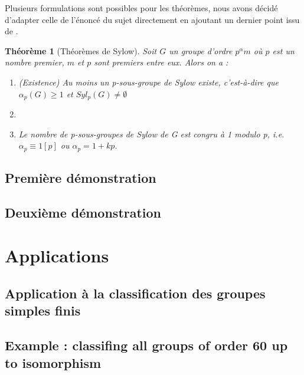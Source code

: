 \documentclass[french]{article}
\theoremstyle{definition}
\theoremstyle{plain}
\newtheorem{theorem}[subsubsection]{Théorème}
\theoremstyle{plain}
\theoremstyle{plain}
\theoremstyle{plain}
\theoremstyle{plain}
\begin{document}
Plusieurs formulations sont possibles pour les théorèmes, 
nous avons décidé d'adapter celle de l'énoncé du sujet directement en ajoutant un dernier point issu de \cite[p.~215]{chen2024napkin}.

\begin{theorem}[Théorèmes de Sylow]
	Soit \( G \) un groupe d'ordre \( p^{\alpha}m \) où \( p \) est un nombre premier, \( m \) et \( p \) sont premiers entre eux. Alors on a :
	\begin{enumerate}[label={\upshape(\roman*)}]
		\item (Existence) Au moins un p-sous-groupe de Sylow existe, c'est-à-dire que \( \alpha_{p}(G) \geq 1 \) et \( Syl_{p}(G) \neq \emptyset \)
		\item 
		\item Le nombre de p-sous-groupes de Sylow de G est congru à 1 modulo p, i.e. \( \alpha_{p} \equiv 1 [p] \) ou \( \alpha_{p} = 1 + kp \).

	\end{enumerate}

\end{theorem}

\subsection{Première démonstration}

\subsection{Deuxième démonstration}


\clearpage
\section{Applications}
\subsection{Application à la classification des groupes simples finis}

\cite{dummit2003abstract}

\subsection{Example : classifing all groups of order 60 up to isomorphism}


\clearpage

\printbibliography
\end{document}
